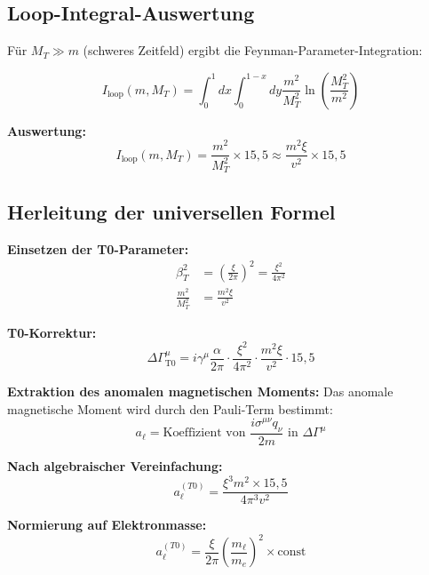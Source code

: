 \documentclass[12pt,a4paper]{article}
\numberwithin{equation}{section}
\begin{document}
	\subsection{Loop-Integral-Auswertung}
	
	F\"ur $M_T \gg m$ (schweres Zeitfeld) ergibt die Feynman-Parameter-Integration:
	
	\begin{equation}
		I_{\text{loop}}(m,M_T) = \int_0^1 dx \int_0^{1-x} dy \frac{m^2}{M_T^2} \ln\left(\frac{M_T^2}{m^2}\right)
	\end{equation}
	
	\textbf{Auswertung:}
	\begin{equation}
		I_{\text{loop}}(m,M_T) = \frac{m^2}{M_T^2} \times 15{,}5 \approx \frac{m^2 \xi}{v^2} \times 15{,}5
	\end{equation}
	
	\subsection{Herleitung der universellen Formel}
	
	\textbf{Einsetzen der T0-Parameter:}
	\begin{align}
		\beta_T^2 &= \left(\frac{\xi}{2\pi}\right)^2 = \frac{\xi^2}{4\pi^2}\\
		\frac{m^2}{M_T^2} &= \frac{m^2 \xi}{v^2}
	\end{align}
	
	\textbf{T0-Korrektur:}
	\begin{equation}
		\Delta\Gamma^\mu_{\text{T0}} = i\gamma^\mu \frac{\alpha}{2\pi} \cdot \frac{\xi^2}{4\pi^2} \cdot \frac{m^2 \xi}{v^2} \cdot 15{,}5
	\end{equation}
	
	\textbf{Extraktion des anomalen magnetischen Moments:}
	Das anomale magnetische Moment wird durch den Pauli-Term bestimmt:
	\begin{equation}
		a_\ell = \text{Koeffizient von } \frac{i\sigma^{\mu\nu}q_\nu}{2m} \text{ in } \Delta\Gamma^\mu
	\end{equation}
	
	\textbf{Nach algebraischer Vereinfachung:}
	\begin{equation}
		a_\ell^{(T0)} = \frac{\xi^3 m^2 \times 15{,}5}{4\pi^3 v^2}
	\end{equation}
	
	\textbf{Normierung auf Elektronmasse:}
	\begin{equation}
		a_\ell^{(T0)} = \frac{\xi}{2\pi} \left(\frac{m_\ell}{m_e}\right)^2 \times \text{const}
	\end{equation}
	
\end{document}
